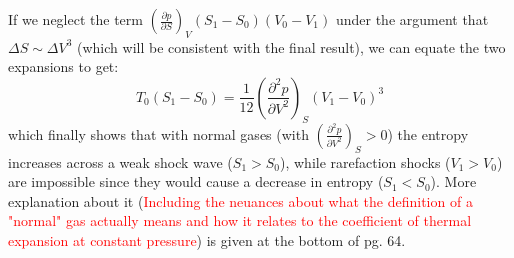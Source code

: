 ﻿\documentclass[11pt]{article}
\begin{document}
\begin{enumerate}
      If we neglect the term $\left( \frac{\partial p}{\partial S} \right)_V (S_1 - S_0)(V_0 - V_1)$ under the argument that $\Delta S \sim \Delta V^3$ (which will be consistent with the final result), we can equate the two expansions to get:
      \begin{equation}
        T_0 (S_1 - S_0) = \frac{1}{12} \left( \frac{\partial^2 p}{\partial V^2} \right)_S (V_1 - V_0)^3
      \end{equation}
      which finally shows that with normal gases (with $\left( \frac{\partial^2 p}{\partial V^2} \right)_S > 0$) the entropy increases across a weak shock wave ($S_1 > S_0$), while rarefaction shocks ($V_1 > V_0$) are impossible since they would cause a decrease in entropy ($S_1 < S_0$). More explanation about it (\textcolor{red}{Including the neuances about what the definition of a "normal" gas actually means and how it relates to the coefficient of thermal expansion at constant pressure}) is given at the bottom of pg. 64.
    \end{enumerate}
\end{document}
